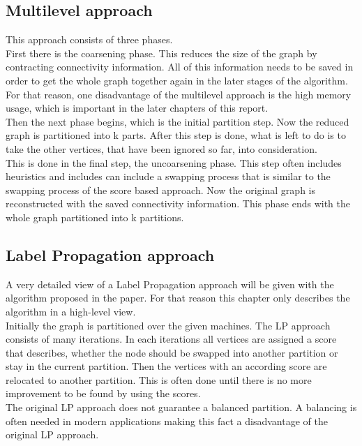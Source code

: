\documentclass[acmsmall,nonacm,screen,review]{acmart}
\begin{document}
\subsection{Multilevel approach}
This approach consists of three phases. \\
First there is the coarsening phase. This reduces the size of the graph by contracting connectivity information. All of this information needs to be saved in order to get the whole graph together again in the later stages of the algorithm. For that reason, one disadvantage of the multilevel approach is the high memory usage, which is important in the later chapters of this report.\\
Then the next phase begins, which is the initial partition step. Now the reduced graph is partitioned into k parts. After this step is done, what is left to do is to take the other vertices, that have been ignored so far, into consideration.\\
This is done in the final step, the uncoarsening phase. This step often includes heuristics and includes can include a swapping process that is similar to the swapping process of the score based approach. Now the original graph is reconstructed with the saved connectivity information. This phase ends with the whole graph partitioned into k partitions.
\subsection{Label Propagation approach}
A very detailed view of a Label Propagation approach will be given with the algorithm proposed in the paper. For that reason this chapter only describes the algorithm in a high-level view.\\
Initially the graph is partitioned over the given machines. The LP approach consists of many iterations. In each iterations all vertices are assigned a score that describes, whether the node should be swapped into another partition or stay in the current partition. Then the vertices with an according score are relocated to another partition. This is often done until there is no more improvement to be found by using the scores.\\
The original LP approach does not guarantee a balanced partition. A balancing is often needed in modern applications making this fact a disadvantage of the original LP approach.
\end{document}

